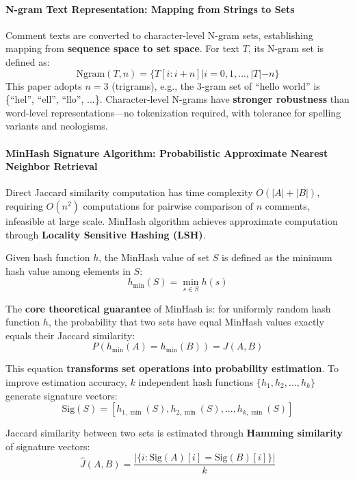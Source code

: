 \documentclass[10pt]{article}
\begin{document}
\paragraph{N-gram Text Representation: Mapping from Strings to Sets}
Comment texts are converted to character-level N-gram sets, establishing mapping from \textbf{sequence space to set space}. For text $T$, its N-gram set is defined as:
\begin{equation}
\text{Ngram}(T, n) = \{T[i:i+n] | i = 0, 1, ..., |T|-n\}
\end{equation}
This paper adopts $n=3$ (trigrams), e.g., the 3-gram set of ``hello world'' is \{``hel'', ``ell'', ``llo'', ...\}. Character-level N-grams have \textbf{stronger robustness} than word-level representations---no tokenization required, with tolerance for spelling variants and neologisms.

\paragraph{MinHash Signature Algorithm: Probabilistic Approximate Nearest Neighbor Retrieval}
Direct Jaccard similarity computation has time complexity $O(|A| + |B|)$, requiring $O(n^2)$ computations for pairwise comparison of $n$ comments, infeasible at large scale. MinHash algorithm\cite{broder1997resemblance} achieves approximate computation through \textbf{Locality Sensitive Hashing (LSH)}.

Given hash function $h$, the MinHash value of set $S$ is defined as the minimum hash value among elements in $S$:
\begin{equation}
h_{\min}(S) = \min_{s \in S} h(s)
\end{equation}

The \textbf{core theoretical guarantee} of MinHash is: for uniformly random hash function $h$, the probability that two sets have equal MinHash values exactly equals their Jaccard similarity:
\begin{equation}
P(h_{\min}(A) = h_{\min}(B)) = J(A, B)
\end{equation}

This equation \textbf{transforms set operations into probability estimation}. To improve estimation accuracy, $k$ independent hash functions $\{h_1, h_2, ..., h_k\}$ generate signature vectors:
\begin{equation}
\text{Sig}(S) = [h_{1,\min}(S), h_{2,\min}(S), ..., h_{k,\min}(S)]
\end{equation}

Jaccard similarity between two sets is estimated through \textbf{Hamming similarity} of signature vectors:
\begin{equation}
\hat{J}(A, B) = \frac{|\{i : \text{Sig}(A)[i] = \text{Sig}(B)[i]\}|}{k}
\end{equation}
\end{document}
